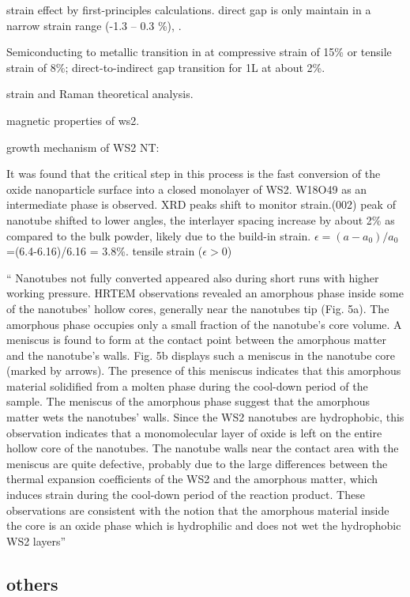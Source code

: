 strain effect by first-principles calculations. direct gap is only maintain in a narrow strain range (-1.3 -- 0.3 \%), \cite{Yun2012}.

Semiconducting to metallic transition in  at compressive strain of 15\% or tensile strain of 8\%; direct-to-indirect gap transition for 1L  at about 2\%. \cite{Scalise2012}


strain and Raman theoretical analysis.\cite{Chang2013a} 

magnetic properties of ws2.\cite{Zhang2013j} 

growth mechanism of WS2 NT:

It was found that the critical step in this process is the fast conversion of the oxide nanoparticle surface into a closed monolayer of WS2. W18O49 as an intermediate phase is observed. XRD peaks shift to monitor strain.(002) peak of nanotube shifted to lower angles, the interlayer spacing increase by about 2\% as compared to the bulk powder, likely due to the build-in strain.\cite{ZAK2009} 
$\epsilon = (a - a_0)/a_0$ =(6.4-6.16)/6.16 = 3.8\%. tensile strain ($\epsilon > 0$)


`` Nanotubes not fully converted appeared also during short
runs with higher working pressure. HRTEM observations
revealed an amorphous phase inside some of the nanotubes’
hollow cores, generally near the nanotubes tip (Fig. 5a). The
amorphous phase occupies only a small fraction of the nanotube’s
core volume. A meniscus is found to form at the contact
point between the amorphous matter and the nanotube’s walls.
Fig. 5b displays such a meniscus in the nanotube core (marked
by arrows). The presence of this meniscus indicates that this
amorphous material solidified from a molten phase during the
cool-down period of the sample. The meniscus of the amorphous
phase suggest that the amorphous matter wets the
nanotubes’ walls. Since the WS2 nanotubes are hydrophobic,
this observation indicates that a monomolecular layer of oxide
is left on the entire hollow core of the nanotubes. The nanotube
walls near the contact area with the meniscus are quite defective,
probably due to the large differences between the thermal
expansion coefficients of the WS2 and the amorphous matter,
which induces strain during the cool-down period of the
reaction product. These observations are consistent with the
notion that the amorphous material inside the core is an oxide
phase which is hydrophilic and does not wet the hydrophobic
WS2 layers''\cite{Margolin2004}

\subsection{others}

